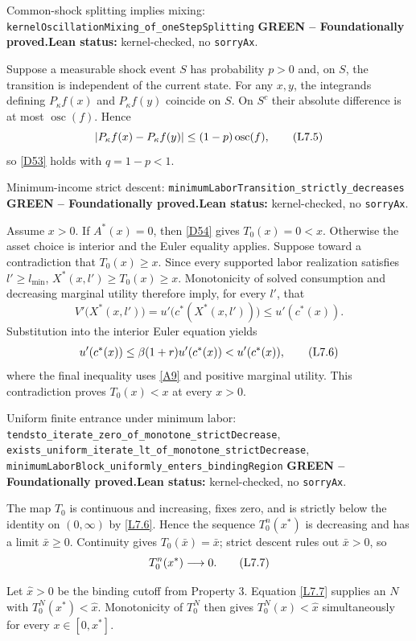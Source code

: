 \documentclass[11pt]{article}
\newcommand{\leanname}[1]{\nolinkurl{#1}}
\newcommand{\eqL}[1]{\refstepcounter{equation}\tag{L#1}}
\newcommand{\formalcheck}{\textbf{Lean status:} kernel-checked, no \texttt{sorryAx}.}
\newcommand{\greenstatus}{\textcolor{proved}{\textbf{GREEN -- Foundationally proved.}}}
\begin{document}
\begin{greenbox}{Common-shock splitting implies mixing:
\leanname{kernelOscillationMixing_of_oneStepSplitting}}
\greenstatus\quad\formalcheck

Suppose a measurable shock event \(S\) has probability \(p>0\) and, on
\(S\), the transition is independent of the current state.  For any
\(x,y\), the integrands defining \(P_\kappa f(x)\) and
\(P_\kappa f(y)\) coincide on \(S\).  On \(S^c\) their absolute difference
is at most \(\operatorname{osc}(f)\).  Hence
\begin{equation}
 |P_\kappa f(x)-P_\kappa f(y)|
 \le (1-p)\operatorname{osc}(f),
 \eqL{7.5}\label{L7.5}
\end{equation}
so \eqref{D53} holds with \(q=1-p<1\).
\end{greenbox}

\begin{greenbox}{Minimum-income strict descent:
\leanname{minimumLaborTransition_strictly_decreases}}
\greenstatus\quad\formalcheck

Assume $x>0$.  If $A^*(x)=0$, then \eqref{D54} gives $T_0(x)=0<x$.
Otherwise the asset choice is interior and the Euler equality applies.
Suppose toward a contradiction that $T_0(x)\ge x$.  Since every supported
labor realization satisfies $l'\ge l_{\min}$,
$X^*(x,l')\ge T_0(x)\ge x$.  Monotonicity of solved consumption and
decreasing marginal utility therefore imply, for every $l'$, that
\[
 V'\bigl(X^*(x,l')\bigr)
 =u'\bigl(c^*(X^*(x,l'))\bigr)\le u'(c^*(x)).
\]
Substitution into the interior Euler equation yields
\begin{equation}
 u'(c^*(x))
 \le \beta(1+r)u'(c^*(x))<u'(c^*(x)),
 \eqL{7.6}\label{L7.6}
\end{equation}
where the final inequality uses \eqref{A9} and positive marginal utility.
This contradiction proves $T_0(x)<x$ at every $x>0$.
\end{greenbox}

\begin{greenbox}{Uniform finite entrance under minimum labor:
\leanname{tendsto_iterate_zero_of_monotone_strictDecrease},
\leanname{exists_uniform_iterate_lt_of_monotone_strictDecrease},
\leanname{minimumLaborBlock_uniformly_enters_bindingRegion}}
\greenstatus\quad\formalcheck

The map $T_0$ is continuous and increasing, fixes zero, and is strictly
below the identity on $(0,\infty)$ by \eqref{L7.6}.  Hence the sequence
$T_0^n(x^*)$ is decreasing and has a limit $\bar x\ge0$.  Continuity gives
$T_0(\bar x)=\bar x$; strict descent rules out $\bar x>0$, so
\begin{equation}
 T_0^n(x^*)\longrightarrow0.
 \eqL{7.7}\label{L7.7}
\end{equation}
\vspace{0.4\baselineskip}\par\noindent
Let $\widehat x>0$ be the binding cutoff from Property 3.  Equation
\eqref{L7.7} supplies an $N$ with $T_0^N(x^*)<\widehat x$.  Monotonicity of
$T_0^N$ then gives $T_0^N(x)<\widehat x$ simultaneously for every
$x\in[0,x^*]$.
\end{greenbox}
\end{document}

